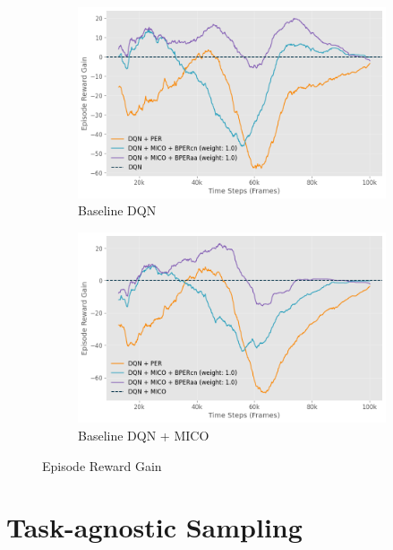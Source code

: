 \begin{figure}[h]
    \centering
    \begin{subfigure}{0.45\textwidth}
    \includegraphics[width=\linewidth]{Results/grid_world/episode_reward_gain_baseline_dqn.png}
        \caption{Baseline DQN}
        \label{fig:episode_reward_gain_dqn}
    \end{subfigure}
    \hfill
    \begin{subfigure}{0.45\textwidth}
        \includegraphics[width=\linewidth]{Results/grid_world/episode_reward_gain_baseline_dqn_mico.png}
        \caption{Baseline DQN + MICO}
        \label{fig:episode_reward_gain_dqn_mico}
    \end{subfigure}
    \caption{Episode Reward Gain }
    \label{fig:episode_reward_gain_dqn_and_mico}
\end{figure}

\section{Task-agnostic Sampling}

